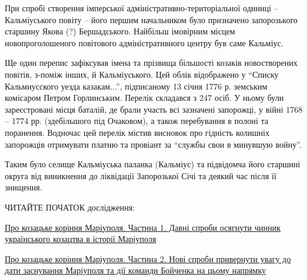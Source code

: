 При спробі створення імперської адміністративно-територіальної одиниці –
Кальміуського повіту – його першим начальником було призначено запорозького
старшину Якова (?) Бершадського. Найбільш імовірним місцем новопроголошеного
повітового адміністративного центру був саме Кальміус.

Ще один перепис зафіксував імена та прізвища більшості козаків новостворених
повітів, з-поміж інших, й Кальміуського. Цей облік відображено у \enquote{Списку
Кальмиусского уезда казакам...}, підписаному 13 січня 1776 р. земським
комісаром Петром Горлинським. Перелік складався з 247 осіб. У ньому були
зареєстровані місця баталій, де брали участь всі зазначені запорожці, у війні
1768 – 1774 рр. (здебільшого під Очаковом), а також перебування в полоні та
поранення. Водночас цей перелік містив висновок про гідність колишніх
запорожців отримувати платню та провіант за \enquote{службы свои в минувшую войну}.

Таким було селище Кальміуська паланка (Кальміус) та підвідомча його старшині
округа від виникнення до ліквідації Запорозької Січі та деякий час після її
знищення.

ЧИТАЙТЕ ПОЧАТОК дослідження:

\href{https://www.0629.com.ua/news/3653256/pro-kozacke-korinna-mariupola-castina-1-davni-sprobi-osagnuti-cinnik-ukrainskogo-kozactva-v-istorii-mariupola}{Про козацьке коріння Маріуполя. Частина 1. Давні спроби осягнути чинник українського козацтва в історії Маріуполя}

\href{https://www.0629.com.ua/news/3654781/pro-kozacke-korinna-mariupola-castina-2-novi-sprobi-privernuti-uvagu-do-dati-zasnuvanna-mariupola-ta-dii-komandi-bojcenka-na-comu-napramku}{Про козацьке коріння Маріуполя. Частина 2. Нові спроби привернути увагу до дати заснування Маріуполя та дії команди Бойченка на цьому напрямку}
